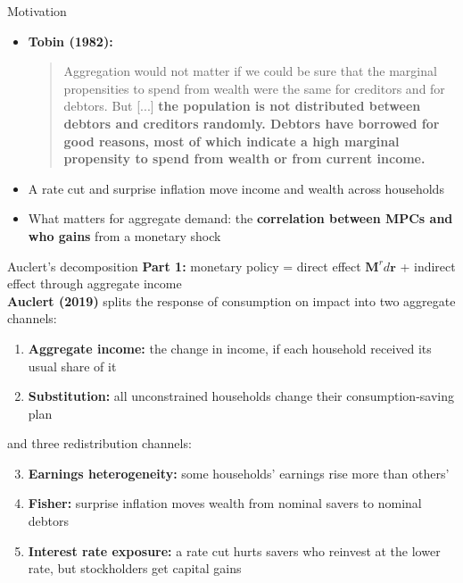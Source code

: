 \documentclass[10pt,english]{beamer}
\begin{document}
\begin{frame}{Motivation}
\begin{itemize}
\item <+->\textbf{Tobin (1982):}
\begin{quote}
\small Aggregation would not matter if we could be sure that the marginal propensities to spend from wealth were the same for creditors and for debtors. But {[}...{]} \textbf{the population is not distributed between debtors and creditors randomly. Debtors have borrowed for good reasons, most of which indicate a high marginal propensity to spend from wealth or from current income.}
\end{quote}
\item <+->A rate cut and surprise inflation move income and wealth across households
\item[$\Rightarrow$] <+-> What matters for aggregate demand: the \textbf{correlation between MPCs and who gains} from a monetary shock
\end{itemize}
\end{frame}
%
\begin{frame}{Auclert's decomposition}
\textbf{Part 1:} monetary policy = direct effect $\boldsymbol{M}^{r}d\boldsymbol{r}$ + indirect effect through aggregate income \\

\textbf{Auclert (2019)} splits the response of consumption on impact into two aggregate channels:


\begin{enumerate}
\item \textbf{Aggregate income:} the change in income, if each household received its usual share of it
\item \textbf{Substitution:} all unconstrained households change their consumption-saving plan
\end{enumerate}

and three redistribution channels:

\begin{enumerate}
\setcounter{enumi}{2}
\item \textbf{Earnings heterogeneity:} some households' earnings rise more than others'
\item \textbf{Fisher:} surprise inflation moves wealth from nominal savers to nominal debtors
\item \textbf{Interest rate exposure:} a rate cut hurts savers who reinvest at the lower rate, but stockholders get capital gains
\end{enumerate}

\end{frame}
\end{document}
